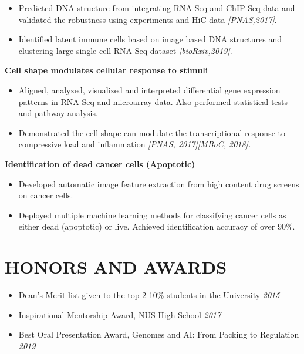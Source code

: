 \documentclass[letterpaper,11pt]{article}
\begin{document}
\begin{itemize}
    \item Predicted DNA structure from integrating RNA-Seq and ChIP-Seq data and validated    the robustness using experiments and HiC data \emph{[PNAS,2017]}.
    \item Identified latent immune cells based on image based DNA structures and clustering large single cell RNA-Seq dataset \emph{[bioRxiv,2019]}.
\end{itemize}
\vspace{1mm}
{\bf Cell shape modulates cellular response to stimuli}
\begin{itemize}
    \item Aligned, analyzed, visualized and interpreted differential gene expression patterns in RNA-Seq and microarray data. Also performed statistical tests and pathway analysis. 
    \item Demonstrated the cell shape can modulate the transcriptional response to compressive load and inflammation \em{[PNAS, 2017][MBoC, 2018]}.
\end{itemize}
\vspace{1mm}
{\bf Identification of dead cancer cells (Apoptotic)}
\begin{itemize}
\item Developed automatic image feature extraction from high content drug screens on cancer cells.
\item Deployed multiple machine learning methods for classifying cancer cells as either dead (apoptotic) or live.
Achieved identification accuracy of over 90\%.
\end{itemize}

\vspace{1mm}
\section{\bf HONORS AND AWARDS}
\begin{itemize}
    \item Dean’s Merit list given to the top 2-10\% students in the University \hfill \emph {2015}
    \item Inspirational Mentorship Award, NUS High School \hfill \emph {2017} 
    \item Best Oral Presentation Award, Genomes and AI: From Packing to Regulation \hfill \emph{2019} 
\end{itemize}

\vspace{1mm}
\end{document}
